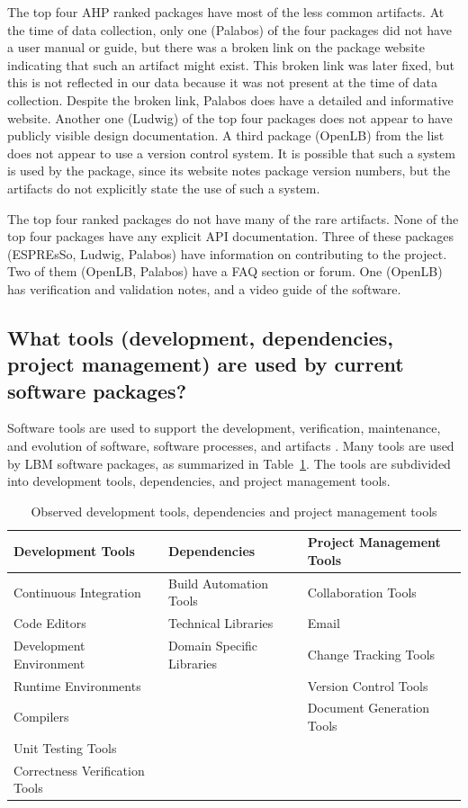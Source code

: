 \documentclass[final, 3p, times, authoryear]{elsarticle}
\begin{document}
The top four AHP ranked packages have most of the less common artifacts. At the
time of data collection, only one (Palabos) of the four packages did not have a
user manual or guide, but there was a broken link on the package website
indicating that such an artifact might exist. This broken link was later fixed,
but this is not reflected in our data because it was not present at the time of
data collection. Despite the broken link, Palabos does have a detailed and
informative website. Another one (Ludwig) of the top four packages does not
appear to have publicly visible design documentation. A third package (OpenLB)
from the list does not appear to use a version control system. It is possible
that such a system is used by the package, since its website notes package
version numbers, but the artifacts do not explicitly state the use of such a
system.

The top four ranked packages do not have many of the rare artifacts. None of the
top four packages have any explicit API documentation. Three of these packages
(ESPREsSo, Ludwig, Palabos) have information on contributing to the project. Two
of them (OpenLB, Palabos) have a FAQ section or forum. One (OpenLB) has
verification and validation notes, and a video guide of the software. 

\subsection{What tools (development, dependencies, project management) are used by current software packages?} \label{tools}

Software tools are used to support the development, verification, maintenance,
and evolution of software, software processes, and artifacts
\citep{ghezzi1991fundamentals}. Many tools are used by LBM software packages, as
summarized in Table~\ref{tbl_tools}.  The tools are subdivided into development
tools, dependencies, and project management tools.

\begin{table}
	\begin{center}
	\begin{tabular}{ p{5.3 cm} p{4.9 cm} p{5 cm}}
	\toprule
	\textbf{Development Tools} & \textbf{Dependencies} & \textbf{Project
	Management Tools} \\
	\midrule
	Continuous Integration & Build Automation Tools & Collaboration Tools\\
	Code Editors & Technical Libraries & Email\\
	Development Environment & Domain Specific Libraries & Change Tracking Tools\\
	Runtime Environments &  & Version Control Tools\\
	Compilers &  & Document Generation Tools\\
	Unit Testing Tools &  & \\
	Correctness Verification Tools &  & \\
	\bottomrule
	\end{tabular}
	\caption{Observed development tools, dependencies and project management tools} \label{tbl_tools}
	\end{center}
\end{table}
\end{document}
